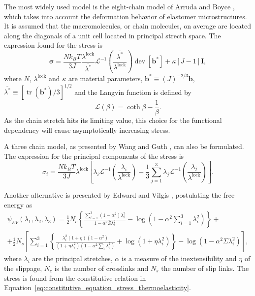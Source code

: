 The most widely used model is the eight-chain model of Arruda and Boyce \citep{arrudaEvolutionPlasticAnisotropy1993, arrudaEffectsStrainRate1995}, which takes into account the deformation behavior of elastomer microstructures.
It is assumed that the macromolecules, or chain molecules, on average are located along the diagonals of a unit cell located in principal strecth space.
The expression found for the stress is
\begin{equation}
	\label{eq:eigth_chain_model}
	\bm \sigma = \frac{Nk_BT}{3J} \frac{\lambda^\text{lock}}{\overline{\lambda^*}}\mathcal L^{-1}\left(\frac{\overline{\lambda^*}}{\lambda^\text{lock}}\right)\operatorname{dev} [\mathbf b^*] + \kappa [J-1]\mathbf I,
\end{equation}
where $N$, $\lambda^\text{lock}$ and $\kappa$ are material parameters, $\mathbf b^*\equiv (J)^{-2/3}\mathbf b$, $\overline{\lambda^*}\equiv [\operatorname{tr}(\mathbf b^*)/3]^{1/2}$ and the Langvin function is defined by
\begin{equation}
	\mathcal L(\beta) = \coth \beta - \frac{1}{\beta}.
\end{equation}
As the chain stretch hits its limiting value, this choice for the functional dependency will cause asymptotically increasing stress.

A three chain model, as presented by Wang and Guth \citep{wangStatisticalTheoryNetworks1952}, can also be formulated.
The expression for the principal components of the stress is
\begin{equation}
	\label{eq:three_chain_model}
	\sigma_i=\frac{Nk_B T}{3J} \lambda^\text{lock} \left[\lambda_i \mathcal L^{-1}\left(\frac{\lambda_i}{\lambda^\text{lock}}\right) - \frac{1}{3} \sum_{j=1}^3 \lambda_j \mathcal L^{-1}\left(\frac{\lambda_j}{\lambda^\text{lock}}\right)\right].
\end{equation}

Another alternative is presented by Edward and Vilgis \citep{edwardsEffectEntanglementsRubber1986}, postulating the free energy as
\begin{multline}
  \label{eq:edward_vilgis_model}
	\psi_{EV}(\lambda_1, \lambda_2, \lambda_3) = \frac{1}{2} N_c\left\{\frac{\sum_{i=1}^3\left(1-\alpha^2\right) \lambda_i^2}{1-\alpha^2 \bar{Z} \lambda_i^2}-\log \left(1-\alpha^2 \sum_{i=1}^3 \lambda_i^2\right)\right\}+ \\
	+\frac{1}{2} N_s\left[\sum_{i=1}^3\left\{\frac{\lambda_i^2(1+\eta)\left(1-\alpha^2\right)}{\left(1+\eta \lambda_i^2\right)\left(1-\alpha^2 \sum_i \lambda_i^2\right)}+\log \left(1+\eta \lambda_i^2\right)\right\}-\log \left(1-\alpha^2 \Sigma \lambda_i^2\right)\right],
\end{multline}
where $\lambda_i$ are the principal stretches, $\alpha$ is a measure of the inextensibility and $\eta$ of the slippage, $N_c$ is the number of crosslinks and $N_s$ the number of slip links.
The stress is found from the constitutive relation in Equation~\eqref{eq:constitutive_equation_stress_thermoelasticity}.

